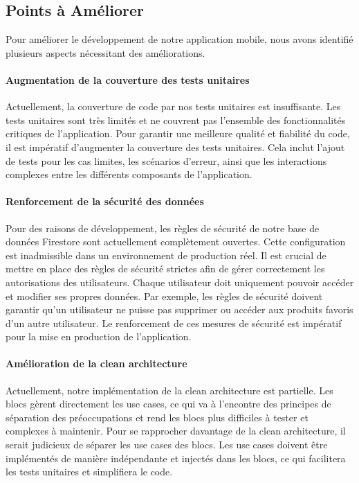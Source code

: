 \subsection{Points à Améliorer}

Pour améliorer le développement de notre application mobile, nous avons identifié plusieurs aspects nécessitant des améliorations.

\paragraph{Augmentation de la couverture des tests unitaires}
Actuellement, la couverture de code par nos tests unitaires est insuffisante. Les tests unitaires sont très limités et ne couvrent pas l'ensemble des fonctionnalités critiques de l'application. Pour garantir une meilleure qualité et fiabilité du code, il est impératif d'augmenter la couverture des tests unitaires. Cela inclut l'ajout de tests pour les cas limites, les scénarios d'erreur, ainsi que les interactions complexes entre les différents composants de l'application.

\paragraph{Renforcement de la sécurité des données}
Pour des raisons de développement, les règles de sécurité de notre base de données Firestore sont actuellement complètement ouvertes. Cette configuration est inadmissible dans un environnement de production réel. Il est crucial de mettre en place des règles de sécurité strictes afin de gérer correctement les autorisations des utilisateurs. Chaque utilisateur doit uniquement pouvoir accéder et modifier ses propres données. Par exemple, les règles de sécurité doivent garantir qu'un utilisateur ne puisse pas supprimer ou accéder aux produits favoris d'un autre utilisateur. Le renforcement de ces mesures de sécurité est impératif pour la mise en production de l'application.

\paragraph{Amélioration de la clean architecture}
Actuellement, notre implémentation de la clean architecture est partielle. Les blocs gèrent directement les use cases, ce qui va à l'encontre des principes de séparation des préoccupations et rend les blocs plus difficiles à tester et complexes à maintenir. Pour se rapprocher davantage de la clean architecture, il serait judicieux de séparer les use cases des blocs. Les use cases doivent être implémentés de manière indépendante et injectés dans les blocs, ce qui facilitera les tests unitaires et simplifiera le code.

